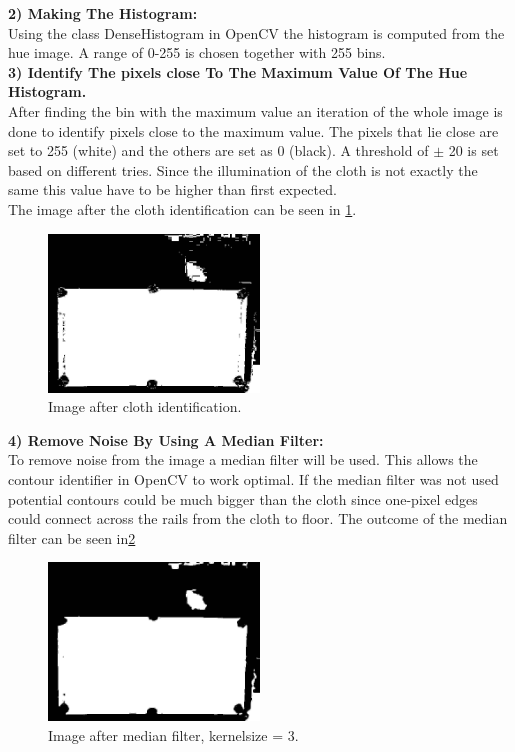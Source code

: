 \textbf{2) Making The Histogram:}\\
Using the class DenseHistogram in OpenCV\cite{opencv} the histogram is computed from the hue image. A range of 0-255 is chosen together with 255 bins.\\

\textbf{3) Identify The pixels close To The Maximum Value Of The Hue Histogram.}\\
After finding the bin with the maximum value an iteration of the whole image is done to identify pixels close to the maximum value. The pixels that lie close are set to 255 (white) and the others are set as 0 (black). A threshold of $\pm$ 20 is set based on different tries. Since the illumination of the cloth is not exactly the same this value have to be higher than first expected.\\

The image after the cloth identification can be seen in \ref{fig:aftercloth}.

\begin{figure}[H]
\begin{center}
\leavevmode
\includegraphics[width=0.5\textwidth]{images/aftercloth}
\end{center}
\caption{Image after cloth identification.}
\label{fig:aftercloth}
\end{figure}

\textbf{4) Remove Noise By Using A Median Filter:}\\
To remove noise from the image a median filter will be used. This allows the contour identifier in OpenCV\cite{opencv} to work optimal. If the median filter was not used potential contours could be much bigger than the cloth since one-pixel edges could connect across the rails from the cloth to floor. The outcome of the median filter can be seen in\ref{fig:afterclothmedian}

\begin{figure}[H]
\begin{center}
\leavevmode
\includegraphics[width=0.5\textwidth]{images/afterclothmedian}
\end{center}
\caption{Image after median filter, kernelsize = 3.}
\label{fig:afterclothmedian}
\end{figure}


